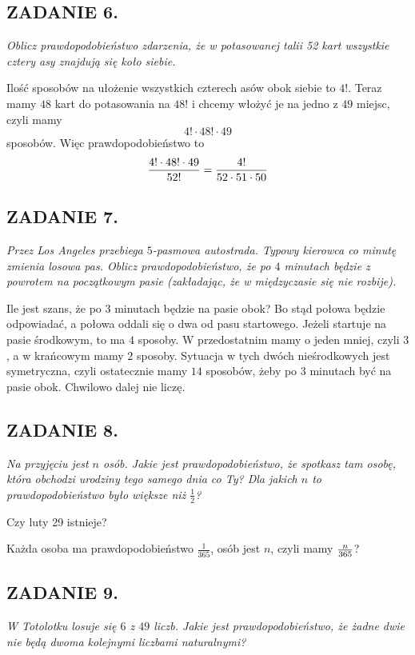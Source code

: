 \documentclass{article}
\begin{document}
\subsection*{ZADANIE 6.}
\emph{Oblicz prawdopodobieństwo zdarzenia, że w potasowanej talii 52 kart wszystkie cztery asy znajdują się koło siebie.}
\smallskip

Ilość sposobów na ułożenie wszystkich czterech asów obok siebie to $4!$. Teraz mamy $48$ kart do potasowania na $48!$ i chcemy włożyć je na jedno z $49$ miejsc, czyli mamy
$${4!\cdot48!\cdot49}$$
sposobów. Więc prawdopodobieństwo to
$${4!\cdot48!\cdot49\over52!}={4!\over52\cdot51\cdot50}$$

\subsection*{ZADANIE 7.}
\emph{Przez Los Angeles przebiega $5$-pasmowa autostrada. Typowy kierowca co minutę zmienia losowa pas. Oblicz prawdopodobieństwo, że po $4$ minutach będzie z powrotem na początkowym pasie (zakładając, że w międzyczasie się nie rozbije).}
\smallskip

Ile jest szans, że po $3$ minutach będzie na pasie obok? Bo stąd połowa będzie odpowiadać, a połowa oddali się o dwa od pasu startowego. Jeżeli startuje na pasie środkowym, to ma $4$ sposoby. W przedostatnim mamy o jeden mniej, czyli $3$, a w krańcowym mamy $2$ sposoby. Sytuacja w tych dwóch nieśrodkowych jest symetryczna, czyli ostatecznie mamy $14$ sposobów, żeby po $3$ minutach być na pasie obok. {\color{orange}Chwilowo dalej nie liczę}.

\subsection*{ZADANIE 8.}
\emph{Na przyjęciu jest $n$ osób. Jakie jest prawdopodobieństwo, że spotkasz tam osobę, która obchodzi urodziny tego samego dnia co Ty? Dla jakich $n$ to prawdopodobieństwo było większe niż $\frac12$?}
\smallskip

Czy luty 29 istnieje?

Każda osoba ma prawdopodobieństwo $\frac1{365}$, osób jest $n$, czyli mamy ${n\over365}$?

\subsection*{ZADANIE 9.}
\emph{W Totolotku losuje się $6$ z $49$ liczb. Jakie jest prawdopodobieństwo, że żadne dwie nie będą dwoma kolejnymi liczbami naturalnymi?}
\smallskip
\end{document}
